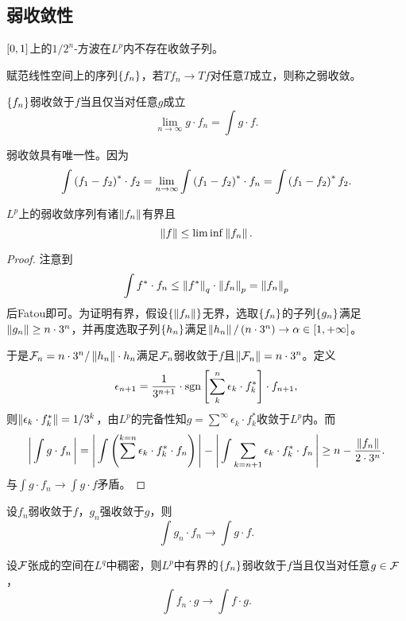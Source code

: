 \documentclass{ctexrep}
\begin{document}
  \subsection{弱收敛性}
  \begin{ex}
    $\left[0,1\right]$上的$1/2^n$-方波在$L^p$内不存在收敛子列。
  \end{ex}
  \begin{definition}
    赋范线性空间上的序列$\left\{f_n\right\}$，若$Tf_n\to Tf$对任意$T$成立，则称之弱收敛。
  \end{definition}
  \begin{proposition}
    $\left\{f_n\right\}$弱收敛于$f$当且仅当对任意$g$成立
    \[ \lim_{n\to\infty} g\cdot f_n = \int g \cdot f. \]
  \end{proposition}
  弱收敛具有唯一性。因为
  \[ \int \left(f_1-f_2\right)^*\cdot f_2 = \lim_{n\to\infty} \int \left(f_1-f_2\right)^*\cdot f_n = \int \left(f_1-f_2\right)^* f_2. \]
  \begin{theorem}
    $L^p$上的弱收敛序列有诸$\left\| f_n \right\|$有界且
    \begin{equation}
    \label{eq:flefn}
      \left\| f \right\| \le \lim \inf \left\| f_n \right\|.
    \end{equation}
  \end{theorem}
  \begin{proof}
    注意到
    \[ \int f^*\cdot f_n \le \left\| f^* \right\|_q \cdot \left\| f_n \right\|_p = \left\| f_n \right\|_p \]
    后Fatou即可。为证明有界，假设$\left\{\left\| f_n \right\|\right\}$无界，选取$\left\{f_n\right\}$的子列$\left\{g_n\right\}$满足$\left\| g_n \right\|\ge n\cdot 3^n$，并再度选取子列$\left\{h_n\right\}$满足$\left\| h_n \right\|/\left(n\cdot 3^n\right)\rightarrow \alpha\in\left[1,+\infty\right]$。
    \par
    于是$\mathcal{F}_n = n\cdot 3^n/\left\| h_n \right\|\cdot h_n$满足$\mathcal{F}_n$弱收敛于$f$且$\left\| \mathcal{F}_n \right\|=n\cdot 3^n$。定义
    \[ \epsilon_{n+1} = \frac{1}{3^{n+1}}\cdot\mathrm{sgn} \left[\sum_k^n \epsilon_k \cdot f_k^*\right]\cdot f_{n+1}, \]
    则$\left\| \epsilon_k\cdot f_k^* \right\|=1/3^k$，由$L^p$的完备性知$g=\sum^\infty \epsilon_k \cdot f_k^*$收敛于$L^p$内。而
    \[ \left|\, \int g\cdot f_n \,\right| = \left|\, \int \left(\sum^{k=n} \epsilon_k \cdot f_k^* \cdot f_n\right) \,\right| -\left|\, \int{\sum_{k=n+1}\epsilon_k \cdot f_k^* \cdot f_n} \,\right| \ge n - \frac{\left\| f_n \right\|}{2\cdot 3^n}. \]
    与$\int g\cdot f_n\rightarrow \int g\cdot f$矛盾。
  \end{proof}
  \begin{collary}
  设$f_n$弱收敛于$f$，$g_n$强收敛于$g$，则
  \[ \int g_n \cdot f_n \rightarrow \int g\cdot f. \]
  \end{collary}
  \begin{proposition}
  设$\mathcal{F}$张成的空间在$L^q$中稠密，则$L^p$中有界的$\left\{f_n\right\}$弱收敛于$f$当且仅当对任意$g\in\mathcal{F}$，
  \[ \int f_n\cdot g \rightarrow \int f\cdot g. \]
  \end{proposition}
\end{document}

